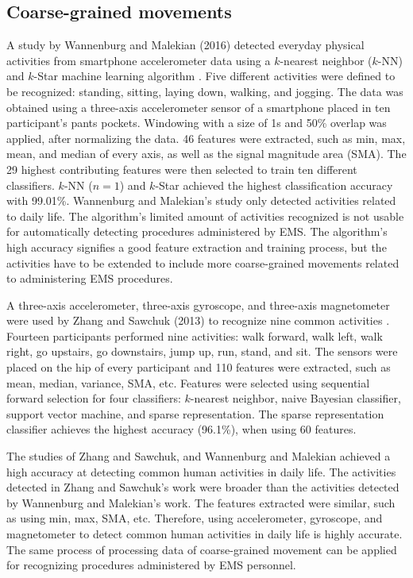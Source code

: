 \subsection{Coarse-grained movements}
A study by Wannenburg and Malekian (2016) detected everyday physical activities from smartphone accelerometer data using a $k$-nearest neighbor ($k$-NN) and $k$-Star machine learning algorithm \cite{Wannenburg2016}. Five different activities were defined to be recognized: standing, sitting, laying down, walking, and jogging. The data was obtained using a three-axis accelerometer sensor of a smartphone placed in ten participant's pants pockets. Windowing with a size of 1s and 50\% overlap was applied, after normalizing the data. 46 features were extracted, such as min, max, mean, and median of every axis, as well as the signal magnitude area (\gls{SMA}). The 29 highest contributing features were then selected to train ten different classifiers. $k$-NN ($n = 1$) and $k$-Star achieved the highest classification accuracy with 99.01\%. Wannenburg and Malekian’s study only detected activities related to daily life. The algorithm's limited amount of activities recognized is not usable for automatically detecting procedures administered by EMS. The algorithm's high accuracy signifies a good feature extraction and training process, but the activities have to be extended to include more coarse-grained movements related to administering EMS procedures.
\par A three-axis accelerometer, three-axis gyroscope, and three-axis magnetometer were used by Zhang and Sawchuk (2013) to recognize nine common activities \cite{Zhang2013}. Fourteen participants performed nine activities: walk forward, walk left, walk right, go upstairs, go downstairs, jump up, run, stand, and sit. The sensors were placed on the hip of every participant and 110 features were extracted, such as mean, median, variance, SMA, etc. Features were selected using sequential forward selection for four classifiers: $k$-nearest neighbor, naive Bayesian classifier, support vector machine, and sparse representation. The sparse representation classifier achieves the highest accuracy (96.1\%), when using 60 features.
\par The studies of Zhang and Sawchuk, and Wannenburg and Malekian achieved a high accuracy at detecting common human activities in daily life. The activities detected in Zhang and Sawchuk's work were broader than the activities detected by Wannenburg and Malekian's work. The features extracted were similar, such as using min, max, SMA, etc. Therefore, using accelerometer, gyroscope, and magnetometer to detect common human activities in daily life is highly accurate. The same process of processing data of coarse-grained movement can be applied for recognizing procedures administered by EMS personnel.
